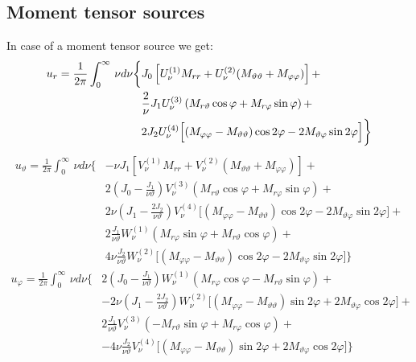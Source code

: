 \documentclass[12pt,a4paper]{article}
\begin{document}
\subsection{Moment tensor sources}
In case of a moment tensor source we get:
\begin{align}
u_r = \frac{1}{2\pi}\int_0^\infty\,\nu d\nu \bigg\{ & J_0\left[U_\nu^{(1)}M_{rr}+U_\nu^{(2)}(M_{\vartheta\vartheta}+M_{\varphi\varphi})\right] + \notag \\
& \frac{2}{\nu}J_1 U_\nu^{(3)} \left(M_{r \vartheta}\cos\varphi+M_{r \varphi}\sin\varphi\right) + \nonumber \\
& 2 J_2 U_\nu^{(4)} \Big[(M_{\varphi\varphi}-M_{\vartheta\vartheta})\cos 2\varphi - 2M_{\vartheta\varphi}\sin 2\varphi\Big]\bigg\} \nonumber 
\end{align}
\begin{align}
u_\vartheta = \frac{1}{2\pi}\int_0^\infty\,\nu d\nu \bigg\{ & -\nu J_1\left[V_\nu^{(1)}M_{rr}+V_\nu^{(2)}(M_{\vartheta\vartheta}+M_{\varphi\varphi})\right] + \nonumber \\
& 2\left(J_0-\frac{J_1}{\nu\vartheta}\right) V_\nu^{(3)} \left(M_{r \vartheta}\cos\varphi+M_{r \varphi}\sin\varphi\right) + \nonumber \\
& 2\nu\left(J_1-\frac{2J_2}{\nu\vartheta}\right) V_\nu^{(4)} \Big[(M_{\varphi\varphi}-M_{\vartheta\vartheta})\cos 2\varphi - 2M_{\vartheta\varphi}\sin 2\varphi\Big] + \nonumber  \\
& 2 \frac{J_1}{\nu\vartheta} W_\nu^{(1)} \left(M_{r \varphi}\sin\varphi+M_{r \vartheta}\cos\varphi\right) + \nonumber  \\
& 4\nu \frac{J_2}{\nu\vartheta} W_\nu^{(2)} \Big[(M_{\varphi\varphi}-M_{\vartheta\vartheta})\cos 2\varphi - 2M_{\vartheta\varphi}\sin 2\varphi\Big]\bigg\} \nonumber
\end{align}
\begin{align}
u_\varphi = \frac{1}{2\pi}\int_0^\infty\,\nu d\nu \bigg\{ & 2\left(J_0-\frac{J_1}{\nu\vartheta}\right) W_\nu^{(1)} \left(M_{r \varphi}\cos\varphi-M_{r \vartheta}\sin\varphi\right) + \nonumber \\
& -2\nu\left(J_1-\frac{2J_2}{\nu\vartheta}\right) W_\nu^{(2)} \Big[(M_{\varphi\varphi}-M_{\vartheta\vartheta})\sin 2\varphi + 2M_{\vartheta\varphi}\cos 2\varphi\Big] + \nonumber  \\
& 2 \frac{J_1}{\nu\vartheta} V_\nu^{(3)} \left(-M_{r \vartheta}\sin\varphi+M_{r \varphi}\cos\varphi\right) + \nonumber \\
& -4\nu \frac{J_2}{\nu\vartheta} V_\nu^{(4)} \Big[(M_{\varphi\varphi}-M_{\vartheta\vartheta})\sin 2\varphi + 2M_{\vartheta\varphi}\cos 2\varphi\Big]\bigg\} \nonumber
\end{align}
\end{document}
